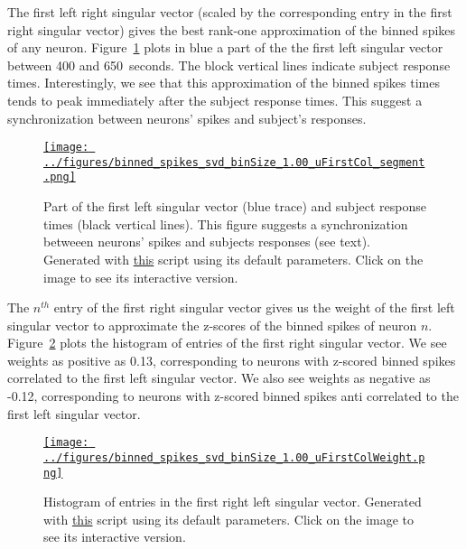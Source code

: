 \documentclass[12pt]{article}
\begin{document}
The first left right singular vector (scaled by the corresponding entry in the
first right singular vector) gives the best rank-one approximation of the
binned spikes of any neuron.
%
Figure~\ref{fig:firstLeftSingularVector} plots in blue a part of the the first
left singular vector between 400 and 650~seconds. The block vertical lines
indicate subject response times. Interestingly, we see that this approximation
of the binned spikes times tends to peak immediately after the subject response
times. This suggest a synchronization between neurons' spikes and subject's
responses.

\begin{figure}[H]
    \begin{center}
        \href{https://www.gatsby.ucl.ac.uk/~rapela/neuroinformatics/2023/ws5/figures/binned_spikes_svd_binSize_1.00_uFirstCol.html}{\texttt{[image: ../figures/binned\_spikes\_svd\_binSize\_1.00\_uFirstCol\_segment.png]}}

        \caption{Part of the first left singular vector (blue trace) and subject response times
        (black vertical lines). This figure suggests a synchronization betweeen
        neurons' spikes and subjects responses (see text).
        Generated with
        \href{https://github.com/joacorapela/neuroinformatics23/blob/master/worksheets/ws5/mySolution/code/scripts/doEx2Plotly.py}{this}
        script using its default parameters. Click on the image to see its
        interactive version.}

        \label{fig:firstLeftSingularVector}
    \end{center}
\end{figure}


The $n^{th}$ entry of the first right singular vector gives us the weight of the
first left singular vector to approximate the z-scores of the binned spikes of
neuron $n$.  Figure~\ref{fig:histEntriesFirstRightSingularVector} plots the
histogram of entries of the first right singular vector. We see
weights as positive as 0.13, corresponding to neurons with z-scored binned
spikes correlated to the first left singular vector. We also see weights
as negative as -0.12, corresponding to neurons with z-scored binned spikes anti
correlated to the first left singular vector.

\begin{figure}[H]
    \begin{center}
        \href{https://www.gatsby.ucl.ac.uk/~rapela/neuroinformatics/2023/ws5/figures/binned_spikes_svd_binSize_1.00_uFirstColWeight.html}{\texttt{[image: ../figures/binned\_spikes\_svd\_binSize\_1.00\_uFirstColWeight.png]}}

        \caption{Histogram of entries in the first right left singular vector.
        Generated with
        \href{https://github.com/joacorapela/neuroinformatics23/blob/master/worksheets/ws5/mySolution/code/scripts/doEx2Plotly.py}{this}
        script using its default parameters. Click on the image to see its
        interactive version.}

        \label{fig:histEntriesFirstRightSingularVector}
    \end{center}
\end{figure}
\end{document}
